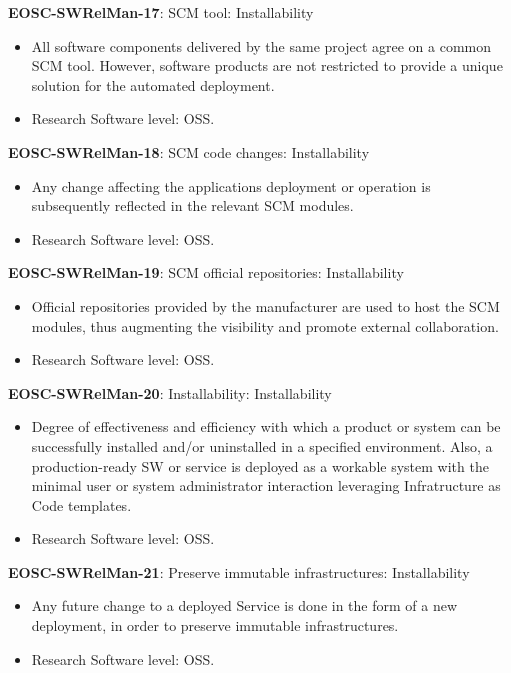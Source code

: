 \textbf{EOSC-SWRelMan-17}: SCM tool: Installability

\begin{itemize}
    \item All software components delivered by the same project agree on a common SCM tool. However, software products are not restricted to provide a unique solution for the automated deployment.~\cite{orviz_set_2017}
    \item Research Software level: OSS.
\end{itemize}

\textbf{EOSC-SWRelMan-18}: SCM code changes: Installability

\begin{itemize}
    \item Any change affecting the applications deployment or operation is subsequently reflected in the relevant SCM modules.~\cite{orviz_set_2017}
    \item Research Software level: OSS.
\end{itemize}

\textbf{EOSC-SWRelMan-19}: SCM official repositories: Installability

\begin{itemize}
    \item Official repositories provided by the manufacturer are used to host the SCM modules, thus augmenting the visibility and promote external collaboration.~\cite{orviz_set_2017}
    \item Research Software level: OSS.
\end{itemize}

\textbf{EOSC-SWRelMan-20}: Installability: Installability

\begin{itemize}
    \item Degree of effectiveness and efficiency with which a product or system can be successfully installed and/or uninstalled in a specified environment. Also, a production-ready SW or service is deployed as a workable system with the minimal user or system administrator interaction leveraging Infratructure as Code templates.~\cite{iso_25010_2011_2017,orviz_fernandez_eosc-synergy_2020}
    \item Research Software level: OSS.
\end{itemize}

\textbf{EOSC-SWRelMan-21}: Preserve immutable infrastructures: Installability

\begin{itemize}
    \item Any future change to a deployed Service is done in the form of a new deployment, in order to preserve immutable infrastructures.~\cite{orviz_fernandez_eosc-synergy_2020}
    \item Research Software level: OSS.
\end{itemize}

